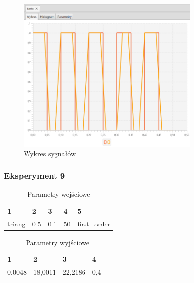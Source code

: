 \documentclass[12pt]{article}
\begin{document}
{{{                \begin{figure}[H]
                    \centering
                    \includegraphics[width=0.8\textwidth]{img/result/experiment2/08/data_draw_original_chart_recon_output_130449.png}
                    \caption{Wykres sygnałów}
                \end{figure}
            }
            \newpage

            \subsubsection{Eksperyment 9} {
                \begin{table}[H]
                    \centering
                    \begin{tabular}{|l|l|l|l|l|}
                        \hline
                        1 & 2 & 3 & 4 & 5   \\ \hline
                        triang & 0.5 & 0.1 & 50 & first\_order   \\ \hline
                    \end{tabular}
                    \caption{Parametry wejściowe}
                \end{table}

                \begin{table}[H]
                    \centering
                    \begin{tabular}{|l|l|l|l|l|}
                        \hline
                        1 & 2 & 3 & 4   \\ \hline
                        0,0048 & 18,0011 & 22,2186 & 0,4 \\ \hline
                    \end{tabular}
                    \caption{Parametry wyjściowe}
                \end{table}


}}}
\end{document}
